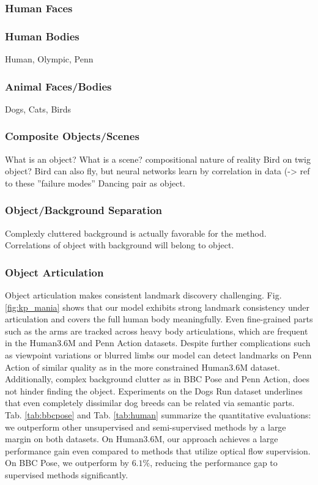 		\subsubsection{Human Faces}
		\subsubsection{Human Bodies}
		Human, Olympic, Penn
		\subsubsection{Animal Faces/Bodies}
		Dogs, Cats, Birds
		\subsubsection{Composite Objects/Scenes}
		What is an object? What is a scene?
		compositional nature of reality
		Bird on twig object? Bird can also fly, but neural networks learn by correlation in data (-> ref to these ''failure modes''
		Dancing pair as object.
		\subsubsection{Object/Background Separation}
			Complexly cluttered background is actually favorable for the method. Correlations of object with background will belong to object.
		\subsubsection{Object Articulation}
			Object articulation makes consistent landmark discovery challenging.
			Fig. \ref{fig:kp_mania} shows that our model exhibits strong landmark consistency under articulation and covers the full human body meaningfully.
			Even fine-grained parts such as the arms are tracked across heavy body articulations, which are frequent in the Human3.6M and Penn Action datasets.
			Despite further complications such as viewpoint variations or blurred limbs our model can detect landmarks on Penn Action of similar quality as in the more constrained Human3.6M dataset.
			Additionally, complex background clutter as in BBC Pose and Penn Action, does not hinder finding the object.
			Experiments on the Dogs Run dataset underlines that even completely dissimilar dog breeds can be related via semantic parts.
			Tab. \ref{tab:bbcpose} and Tab. \ref{tab:human} summarize the quantitative evaluations: we outperform other unsupervised and semi-supervised methods by a large margin on both datasets.
			On Human3.6M, our approach achieves a large performance gain even compared to methods that utilize optical flow supervision.
			On BBC Pose, we outperform \cite{jakab18} by $6.1\%$, reducing the performance gap to supervised methods significantly.
